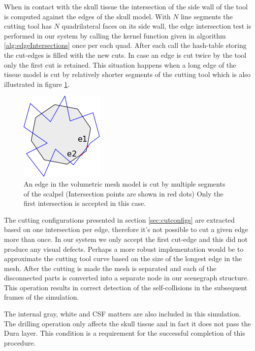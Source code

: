 When in contact with the skull tissue the intersection of the side wall of the tool is computed against the edges of the 
skull model. With $N$ line segments the cutting tool has $N$ quadrilateral faces on its side wall, the edge intersection 
test is performed in our system by calling the kernel function given in algorithm \ref{alg:edgeIntersections} once per each quad.
After each call the hash-table storing the cut-edges is filled with the new cuts. In case an edge is cut twice by the tool only 
the first cut is retained. This situation happens when a long edge of the tissue model is cut by relatively shorter segments of 
the cutting tool which is also illustrated in figure \ref{fig:ringscalpalissue}.

\begin{figure}[H]
  \centering
  \includegraphics[width=0.2\linewidth]{figures/evaluation/ringscalpalissue.png}
  \caption{\label{fig:ringscalpalissue}
  {An edge in the volumetric mesh model is cut by multiple segments of the scalpel (Intersection points are shown in red dots)
   Only the first intersection is accepted in this case.}
}
\end{figure}


The cutting configurations presented in section \ref{sec:cutconfigs} are extracted based on one intersection per edge, therefore
it's not possible to cut a given edge more than once. In our system we only accept the first cut-edge and this did not produce any 
visual defects. Perhaps a more robust implementation would be to approximate the cutting tool curve based on the size of the longest 
edge in the mesh. After the cutting is made the mesh is separated and each of the disconnected parts is converted into a separate node
in our scenegraph structure. This operation results in correct detection of the self-collisions in the subsequent frames of the simulation.

The internal gray, white and CSF matters are also included in this simulation. The drilling operation only affects the skull tissue and
in fact it does not pass the Dura layer. This condition is a requirement for the successful completion of this procedure. 

